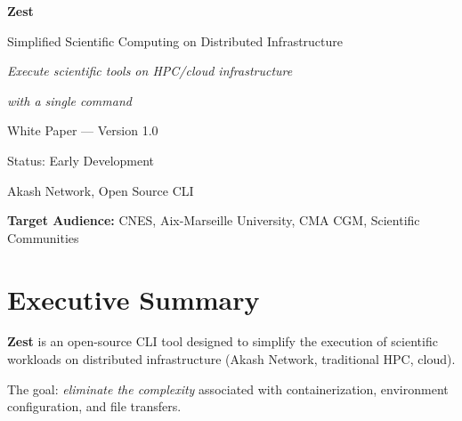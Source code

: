 \documentclass[11pt,a4paper]{article}
\newcommand{\highlight}[1]{\textbf{\color{darkblue}#1}}
\begin{document}
	
	\thispagestyle{empty}
	\vspace*{2cm}
	
	\begin{center}
		{\Huge\color{darkblue}\textbf{Zest}}
		\vspace{0.5cm}
		
		{\Large\color{darkgray}Simplified Scientific Computing on Distributed Infrastructure}
		\vspace{2cm}
		
		{\large\color{darkgray}\textit{Execute scientific tools on HPC/cloud infrastructure}}
		\vspace{0.2cm}
		
		{\large\color{darkgray}\textit{with a single command}}
		\vspace{3cm}
		
		{\large\color{darkgray}White Paper --- Version 1.0}
		\vspace{0.5cm}
		
		{\small\color{darkgray}Status: Early Development}
		\vspace{3cm}
		
		{\small\color{darkgray}Akash Network, Open Source CLI}
	\end{center}
	
	\vfill
	
	\noindent\color{darkgray}\small
	\textbf{Target Audience:} CNES, Aix-Marseille University, CMA CGM, Scientific Communities
	
	\newpage
	
	\tableofcontents
	
	\newpage
	
	\section{Executive Summary}
	
	\highlight{Zest} is an open-source CLI tool designed to simplify the execution of scientific workloads on distributed infrastructure (Akash Network, traditional HPC, cloud).
	
	The goal: \textit{eliminate the complexity} associated with containerization, environment configuration, and file transfers.
	
\end{document}
